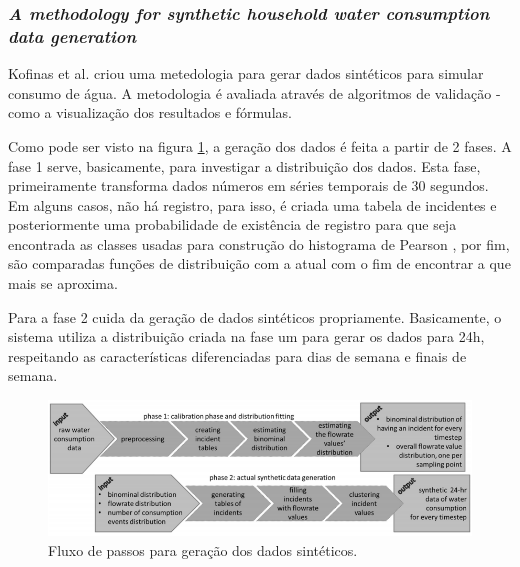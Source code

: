 \documentclass[
	12pt,				%
	openright,			%
	twoside,			%
	a4paper,			%
	english,			%
	brazil				%
	]{abntex2}
\begin{document}
	\subsubsection{\emph{A methodology for synthetic household water consumption data generation}}
	Kofinas et al. \cite{Kofinas2018} criou uma metedologia para gerar dados sintéticos para simular consumo de água. A metodologia é avaliada através de algoritmos de validação - como a visualização dos resultados e fórmulas.
	\par
	Como pode ser visto na figura \ref{fig:kofinas}, a geração dos dados é feita a partir de 2 fases. A fase 1 serve, basicamente, para investigar a distribuição dos dados. Esta fase, primeiramente transforma dados números em séries temporais de 30 segundos. Em alguns casos, não há registro, para isso, é criada uma tabela de incidentes e posteriormente uma probabilidade de existência de registro para que seja encontrada as classes usadas para construção do histograma de Pearson \cite{dean2009descriptive}, por fim, são comparadas funções de distribuição com a atual com o fim de encontrar a que mais se aproxima.
	\par
	Para a fase 2 cuida da geração de dados sintéticos propriamente. Basicamente, o sistema utiliza a distribuição criada na fase um para gerar os dados para 24h, respeitando as características diferenciadas para dias de semana e finais de semana.
	\begin{figure}[h!]
		\centering
		\includegraphics[width=\linewidth]{./figures/TrabalhosRelacionados/Kofinas21.png}
		\caption{Fluxo de passos para geração dos dados sintéticos.}
		\label{fig:kofinas}
	\end{figure}
\end{document}
